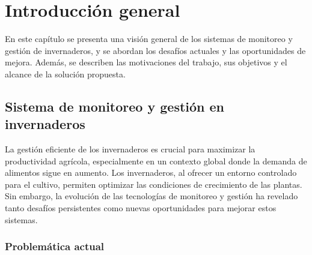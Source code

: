 
\chapter{Introducción general} %

\label{Chapter1} %
\label{IntroGeneral}


\newcommand{\keyword}[1]{\textbf{#1}}
\newcommand{\tabhead}[1]{\textbf{#1}}
\newcommand{\code}[1]{\texttt{#1}}
\newcommand{\file}[1]{\texttt{\bfseries#1}}
\newcommand{\option}[1]{\texttt{\itshape#1}}
\newcommand{\grados}{$^{\circ}$}


En este capítulo se presenta una visión general de los sistemas de monitoreo y gestión de invernaderos, y se abordan los desafíos actuales y las oportunidades de mejora. Además, se describen las motivaciones del trabajo, sus objetivos y el alcance de la solución propuesta. 
\section{Sistema de monitoreo y gestión en invernaderos}

La gestión eficiente de los invernaderos es crucial para maximizar la productividad agrícola, especialmente en un contexto global donde la demanda de alimentos sigue en aumento. Los invernaderos, al ofrecer un entorno controlado para el cultivo, permiten optimizar las condiciones de crecimiento de las plantas. Sin embargo, la evolución de las tecnologías de monitoreo y gestión ha revelado tanto desafíos persistentes como nuevas oportunidades para mejorar estos sistemas.

\subsection{Problemática actual}

